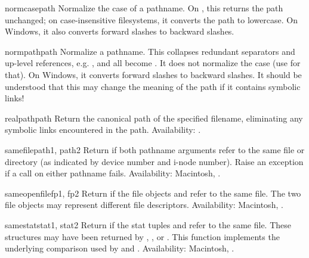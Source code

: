 \begin{funcdesc}{normcase}{path}
Normalize the case of a pathname.  On \UNIX, this returns the path
unchanged; on case-insensitive filesystems, it converts the path to
lowercase.  On Windows, it also converts forward slashes to backward
slashes.
\end{funcdesc}

\begin{funcdesc}{normpath}{path}
Normalize a pathname.  This collapses redundant separators and
up-level references, e.g. ,  and
 all become .  It does not normalize the
case (use  for that).  On Windows, it converts
forward slashes to backward slashes. It should be understood that this may
change the meaning of the path if it contains symbolic links! 
\end{funcdesc}

\begin{funcdesc}{realpath}{path}
Return the canonical path of the specified filename, eliminating any
symbolic links encountered in the path.
Availability:  \UNIX.
\end{funcdesc}

\begin{funcdesc}{samefile}{path1, path2}
Return  if both pathname arguments refer to the same file or
directory (as indicated by device number and i-node number).
Raise an exception if a  call on either pathname
fails.
Availability:  Macintosh, \UNIX.
\end{funcdesc}

\begin{funcdesc}{sameopenfile}{fp1, fp2}
Return  if the file objects  and  refer to the
same file.  The two file objects may represent different file
descriptors.
Availability:  Macintosh, \UNIX.
\end{funcdesc}

\begin{funcdesc}{samestat}{stat1, stat2}
Return  if the stat tuples  and  refer to
the same file.  These structures may have been returned by
, , or .  This
function implements the underlying comparison used by
 and .
Availability:  Macintosh, \UNIX.
\end{funcdesc}


